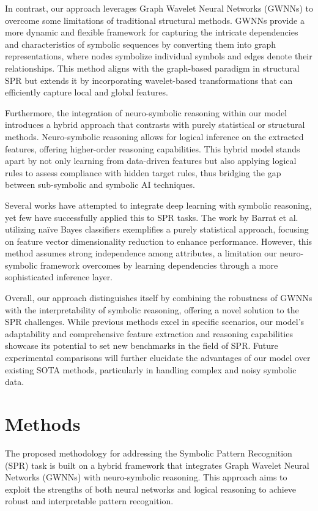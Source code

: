 \documentclass{article}
\begin{document}
In contrast, our approach leverages Graph Wavelet Neural Networks (GWNNs) to overcome some limitations of traditional structural methods. GWNNs provide a more dynamic and flexible framework for capturing the intricate dependencies and characteristics of symbolic sequences by converting them into graph representations, where nodes symbolize individual symbols and edges denote their relationships. This method aligns with the graph-based paradigm in structural SPR but extends it by incorporating wavelet-based transformations that can efficiently capture local and global features.

Furthermore, the integration of neuro-symbolic reasoning within our model introduces a hybrid approach that contrasts with purely statistical or structural methods. Neuro-symbolic reasoning allows for logical inference on the extracted features, offering higher-order reasoning capabilities. This hybrid model stands apart by not only learning from data-driven features but also applying logical rules to assess compliance with hidden target rules, thus bridging the gap between sub-symbolic and symbolic AI techniques.

Several works have attempted to integrate deep learning with symbolic reasoning, yet few have successfully applied this to SPR tasks. The work by Barrat et al. utilizing naïve Bayes classifiers exemplifies a purely statistical approach, focusing on feature vector dimensionality reduction to enhance performance. However, this method assumes strong independence among attributes, a limitation our neuro-symbolic framework overcomes by learning dependencies through a more sophisticated inference layer.

Overall, our approach distinguishes itself by combining the robustness of GWNNs with the interpretability of symbolic reasoning, offering a novel solution to the SPR challenges. While previous methods excel in specific scenarios, our model's adaptability and comprehensive feature extraction and reasoning capabilities showcase its potential to set new benchmarks in the field of SPR. Future experimental comparisons will further elucidate the advantages of our model over existing SOTA methods, particularly in handling complex and noisy symbolic data.

\section{Methods}
The proposed methodology for addressing the Symbolic Pattern Recognition (SPR) task is built on a hybrid framework that integrates Graph Wavelet Neural Networks (GWNNs) with neuro-symbolic reasoning. This approach aims to exploit the strengths of both neural networks and logical reasoning to achieve robust and interpretable pattern recognition.
\end{document}
